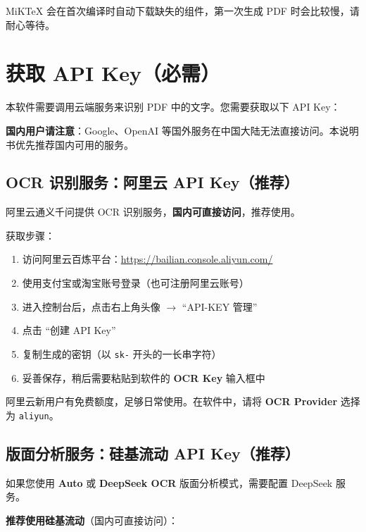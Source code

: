\documentclass[UTF8,zihao=-4,openany]{ctexbook}
\begin{document}
\begin{WarnBox}
	MiKTeX 会在首次编译时自动下载缺失的组件，第一次生成 PDF 时会比较慢，请耐心等待。
\end{WarnBox}

\section{获取 API Key（必需）}

本软件需要调用云端服务来识别 PDF 中的文字。您需要获取以下 API Key：

\begin{WarnBox}
	\textbf{国内用户请注意}：Google、OpenAI 等国外服务在中国大陆无法直接访问。本说明书优先推荐国内可用的服务。
\end{WarnBox}

\subsection{OCR 识别服务：阿里云 API Key（推荐）}

阿里云通义千问提供 OCR 识别服务，\textbf{国内可直接访问}，推荐使用。

获取步骤：
\begin{enumerate}
	\item 访问阿里云百炼平台：\url{https://bailian.console.aliyun.com/}
	\item 使用支付宝或淘宝账号登录（也可注册阿里云账号）
	\item 进入控制台后，点击右上角头像 $\rightarrow$ ``API-KEY 管理''
	\item 点击 ``创建 API Key''
	\item 复制生成的密钥（以 \texttt{sk-} 开头的一长串字符）
	\item 妥善保存，稍后需要粘贴到软件的 \textbf{OCR Key} 输入框中
\end{enumerate}

\begin{TipBox}
	阿里云新用户有免费额度，足够日常使用。在软件中，请将 \textbf{OCR Provider} 选择为 \texttt{aliyun}。
\end{TipBox}

\subsection{版面分析服务：硅基流动 API Key（推荐）}

如果您使用 \textbf{Auto} 或 \textbf{DeepSeek OCR} 版面分析模式，需要配置 DeepSeek 服务。

\textbf{推荐使用硅基流动}（国内可直接访问）：
\end{document}
